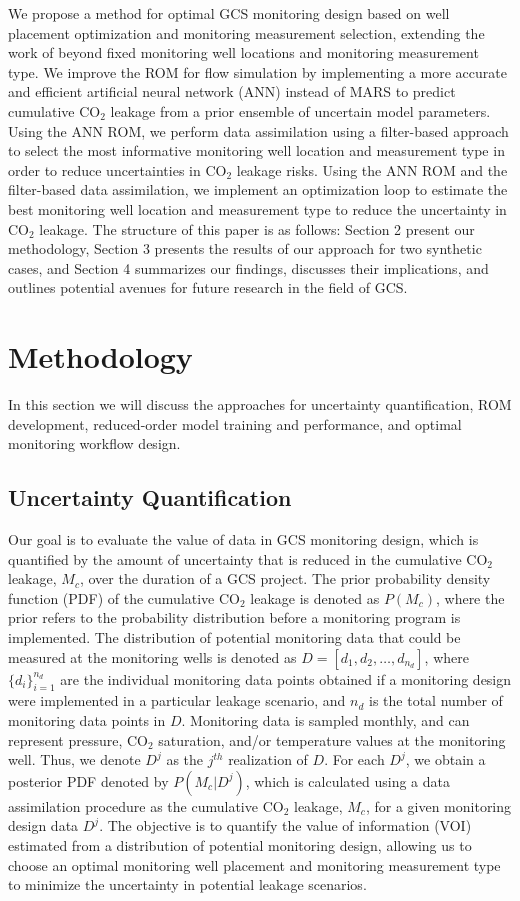 \documentclass[a4paper,fleqn]{cas-sc}
\begin{document}
We propose a method for optimal GCS monitoring design based on well placement optimization and monitoring measurement selection, extending the work of \citet{Chen2018} beyond fixed monitoring well locations and monitoring measurement type. We improve the ROM for flow simulation by implementing a more accurate and efficient artificial neural network (ANN) instead of MARS to predict cumulative CO$_2$ leakage from a prior ensemble of uncertain model parameters. Using the ANN ROM, we perform data assimilation using a filter-based approach to select the most informative monitoring well location and measurement type in order to reduce uncertainties in CO$_2$ leakage risks. Using the ANN ROM and the filter-based data assimilation, we implement an optimization loop to estimate the best monitoring well location and measurement type to reduce the uncertainty in CO$_2$ leakage. The structure of this paper is as follows: Section 2 present our methodology, Section 3 presents the results of our approach for two synthetic cases, and Section 4 summarizes our findings, discusses their implications, and outlines potential avenues for future research in the field of GCS.

\section{Methodology}
In this section we will discuss the approaches for uncertainty quantification, ROM development, reduced-order model training and performance, and optimal monitoring workflow design.

\subsection{Uncertainty Quantification}
Our goal is to evaluate the value of data in GCS monitoring design, which is quantified by the amount of uncertainty that is reduced in the cumulative CO$_2$ leakage, $M_c$, over the duration of a GCS project. The prior probability density function (PDF) of the cumulative CO$_2$ leakage is denoted as $P(M_c)$, where the prior refers to the probability distribution before a monitoring program is implemented. The distribution of potential monitoring data that could be measured at the monitoring wells is denoted as $D=[d_1,d_2,\ldots,d_{n_d}]$, where $\{d_i\}_{i=1}^{n_d}$ are the individual monitoring data points obtained if a monitoring design were implemented in a particular leakage scenario, and $n_d$ is the total number of monitoring data points in $D$. Monitoring data is sampled monthly, and can represent pressure, CO$_2$ saturation, and/or temperature values at the monitoring well. Thus, we denote $D^j$ as the $j^{th}$ realization of $D$. For each $D^j$, we obtain a posterior PDF denoted by $P(M_c \vert D^j)$, which is calculated using a data assimilation procedure as the cumulative CO$_2$ leakage, $M_c$, for a given monitoring design data $D^j$. The objective is to quantify the value of information (VOI) estimated from a distribution of potential monitoring design, allowing us to choose an optimal monitoring well placement and monitoring measurement type to minimize the uncertainty in potential leakage scenarios.
\end{document}
